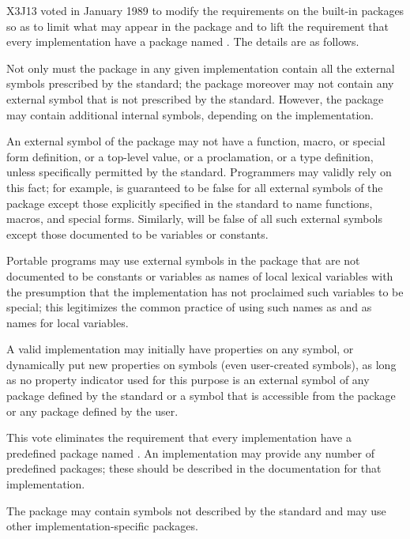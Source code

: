 \begin{new}
X3J13 voted in January 1989
to modify the requirements on the built-in packages
so as to limit what may appear in the  package
and to lift the requirement that every implementation have a package
named .  The details are as follows.

Not only must the  package in any given implementation
contain all the external symbols prescribed by the standard;
the  package moreover may not contain any external symbol
that is not prescribed by the standard.  However, the 
package may contain additional internal symbols, depending on the
implementation.

An external symbol of the  package may not have a function,
macro, or special form definition, or a top-level value,
or a  proclamation, or a type definition, unless specifically
permitted by the standard.  Programmers may validly rely on this fact;
for example,  is guaranteed to be false for all
external symbols of the  package except those explicitly
specified in the standard to name functions, macros, and special forms.
Similarly,  will be false of all such external symbols
except those documented to be variables or constants.

Portable programs
may use external symbols in the  package that are not documented
to be constants or variables as names of local lexical
variables with the presumption that the implementation has not
proclaimed such variables to be special; this legitimizes the common
practice of using such names as  and  as names
for local variables.

A valid implementation may initially have properties on any symbol,
or dynamically put new properties on symbols (even user-created symbols),
as long as no property indicator used for this purpose is
an external symbol of any package defined by the standard
or a symbol that is accessible from the  package or any
package defined by the user.

This vote eliminates the requirement that every implementation have
a predefined package named .  An implementation may
provide any number of predefined packages; these should be described
in the documentation for that implementation.

The  package may contain symbols not described by the standard
and may use other implementation-specific packages.
\end{new}


